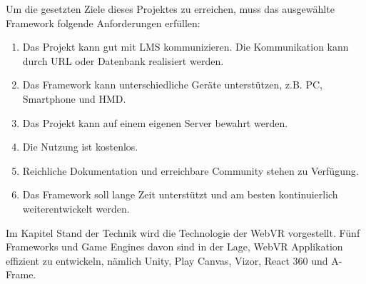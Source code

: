  Um die gesetzten Ziele dieses Projektes zu erreichen, muss das ausgewählte Framework folgende Anforderungen erfüllen:
 
 \begin{enumerate}
     \item Das Projekt kann gut mit LMS kommunizieren. Die Kommunikation kann durch URL oder Datenbank realisiert werden.
     \item Das Framework kann unterschiedliche Geräte unterstützen, z.B. PC, Smartphone und HMD.
     \item Das Projekt kann auf einem eigenen Server bewahrt werden.
     \item Die Nutzung ist kostenlos.
     \item Reichliche Dokumentation und erreichbare Community stehen zu Verfügung.
     \item Das Framework soll lange Zeit unterstützt und am besten kontinuierlich weiterentwickelt werden.
 \end{enumerate}
 
 Im Kapitel Stand der Technik wird die Technologie der WebVR vorgestellt. Fünf Frameworks und Game Engines davon sind in der Lage, WebVR Applikation effizient zu entwickeln, nämlich Unity, Play Canvas, Vizor, React 360 und A-Frame.
 
